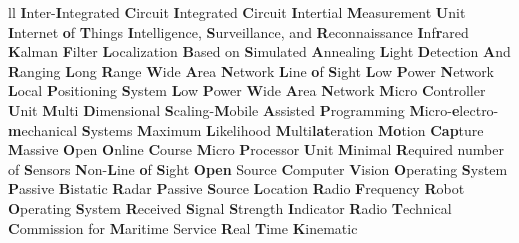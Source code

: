 \begin{abbreviations}{ll}
    		{\textbf{I}nter-\textbf{I}ntegrated \textbf{C}ircuit}
    			{\textbf{I}ntegrated  \textbf{C}ircuit}
    		{\textbf{I}ntertial \textbf{M}easurement \textbf{U}nit}
    		{\textbf{I}nternet \textbf{o}f \textbf{T}hings}
    		{\textbf{I}ntelligence, \textbf{S}urveillance, and \textbf{R}econnaissance}
    		    {\textbf{I}nf\textbf{r}ared}
    			{\textbf{K}alman \textbf{F}ilter}
    		{\textbf{L}ocalization \textbf{B}ased on \textbf{S}imulated \textbf{A}nnealing}
    		{\textbf{L}ight \textbf{D}etection \textbf{A}nd \textbf{R}anging}
    	{\textbf{L}ong \textbf{R}ange \textbf{W}ide \textbf{A}rea \textbf{N}etwork}
    		{\textbf{L}ine   \textbf{o}f \textbf{S}ight}
    		{\textbf{L}ow \textbf{P}ower \textbf{N}etwork}
    		{\textbf{L}ocal \textbf{P}ositioning \textbf{S}ystem}
    		{\textbf{L}ow \textbf{P}ower \textbf{W}ide \textbf{A}rea \textbf{N}etwork}
    		{\textbf{M}icro \textbf{C}ontroller \textbf{U}nit}
    	{\textbf{M}ulti \textbf{D}imensional \textbf{S}caling-\textbf{M}obile \textbf{A}ssisted \textbf{P}rogramming}
    		{\textbf{M}icro-\textbf{e}lectro-\textbf{m}echanical \textbf{S}ystems}
    			{\textbf{M}aximum \textbf{L}ikelihood}
    		{\textbf{M}ulti\textbf{lat}eration}
    		{\textbf{Mo}tion \textbf{Cap}ture}
    		{\textbf{M}assive \textbf{O}pen \textbf{O}nline \textbf{C}ourse}
    		{\textbf{M}icro \textbf{P}rocessor \textbf{U}nit}
    		{\textbf{M}inimal \textbf{R}equired number of \textbf{S}ensors}
    		{\textbf{N}on-\textbf{L}ine \textbf{o}f \textbf{S}ight}
    		{\textbf{Open} Source \textbf{C}omputer \textbf{V}ision}
    			{\textbf{O}perating \textbf{S}ystem}
    		{\textbf{P}assive \textbf{B}istatic \textbf{R}adar}
    		{\textbf{P}assive \textbf{S}ource \textbf{L}ocation}
    	   		{\textbf{R}adio \textbf{F}requency}
    		{\textbf{R}obot \textbf{O}perating \textbf{S}ystem}
    		{\textbf{R}eceived \textbf{S}ignal \textbf{S}trength \textbf{I}ndicator}
    		{\textbf{R}adio \textbf{T}echnical \textbf{C}ommission for \textbf{M}aritime Service}
    		{\textbf{R}eal \textbf{T}ime \textbf{K}inematic}

\end{abbreviations}
